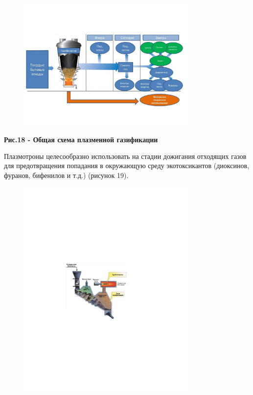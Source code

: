 \begin{figure}[H]
	\centering
	\includegraphics[width=0.8\textwidth]{media/chem2/image82}
	\caption*{}
\end{figure}


{\bfseries Рис.18 - Общая схема плазменной газификации}

Плазмотроны целесообразно использовать на стадии дожигания отходящих
газов для предотвращения попадания в окружающую среду экотоксикантов
(диоксинов, фуранов, бифенилов и т.д.) (рисунок 19).


\begin{figure}[H]
	\centering
	\includegraphics[width=0.8\textwidth]{media/chem2/image83}
	\caption*{}
\end{figure}


